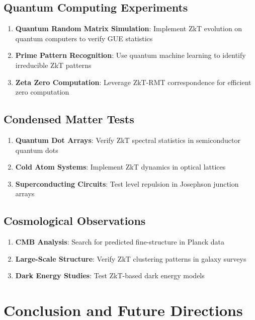 \documentclass[12pt]{article}
\theoremstyle{plain}
\theoremstyle{definition}
\begin{document}
\subsection{Quantum Computing Experiments}

\begin{enumerate}
\item \textbf{Quantum Random Matrix Simulation}: Implement ZkT evolution on quantum computers to verify GUE statistics
\item \textbf{Prime Pattern Recognition}: Use quantum machine learning to identify irreducible ZkT patterns
\item \textbf{Zeta Zero Computation}: Leverage ZkT-RMT correspondence for efficient zero computation
\end{enumerate}

\subsection{Condensed Matter Tests}

\begin{enumerate}
\item \textbf{Quantum Dot Arrays}: Verify ZkT spectral statistics in semiconductor quantum dots
\item \textbf{Cold Atom Systems}: Implement ZkT dynamics in optical lattices
\item \textbf{Superconducting Circuits}: Test level repulsion in Josephson junction arrays
\end{enumerate}

\subsection{Cosmological Observations}

\begin{enumerate}
\item \textbf{CMB Analysis}: Search for predicted fine-structure in Planck data
\item \textbf{Large-Scale Structure}: Verify ZkT clustering patterns in galaxy surveys
\item \textbf{Dark Energy Studies}: Test ZkT-based dark energy models
\end{enumerate}

\section{Conclusion and Future Directions}
\end{document}
